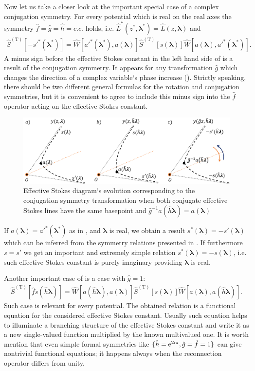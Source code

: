 \documentclass[12pt]{iopart}
\def\S{\widehat{S}}
\def\W{\widehat{W}}
\def\f{\hat{f}}
\def\g{\hat{g}}
\def\h{\hat{h}}
\def\L{\widehat{L}}
\def\lmbd{\bm{\lambda}}
\def\Tp{\mathrm{T}}
\def\unity{1}
\begin{document}
Now let us take a closer look at the important special case of a complex conjugation symmetry. 
For every potential which is real on the real axes the symmetry $\f=\g=\h=c.c.$ holds, 
i.e. $\L^*(z^*,\lmbd^*)=\L(z,\lmbd)$ and
\begin{eqnarray}
\S^{(\Tp)} \left[ -s'^*(\lmbd^*) \right] = 
\W \left[ a'^*(\lmbd^*),a(\lmbd) \right]
\S^{(\Tp)} \left[ s(\lmbd) \right]
\W \left[ a(\lmbd),a'^*(\lmbd^*) \right].
\label{eq:cnjgtn}
\end{eqnarray}
A minus sign before the effective Stokes constant in the left hand side of  is a result 
of the conjugation symmetry. It appears for any transformation $\g$ which changes the direction 
of a complex variable`s phase increase (). Strictly speaking, there should be two 
different general formulas for the rotation and conjugation symmetries, but it is convenient 
to agree to include this minus sign into the $\f$ operator acting on the effective Stokes constant.

\begin{figure}
\centering
\noindent
\includegraphics[width=\textwidth]{stuff/cs.png}
\caption{Effective Stokes diagram`s evolution corresponding to the conjugation 
symmetry transformation when both conjugate effective Stokes lines have the same 
basepoint and $\g^{-1}a(\h\lmbd)=a(\lmbd)$}
\label{fig:cst}
\end{figure} 

If $a(\lmbd)=a'^*(\lmbd^*)$ as in , and $\lmbd$ is real, we obtain a result 
$s^*(\lmbd)=-s'(\lmbd)$ which can be inferred from the symmetry relations presented in \cite{symm}. 
If furthermore $s=s'$ we get an important and extremely simple relation $s^*(\lmbd)=-s(\lmbd)$, 
i.e. such effective Stokes constant is purely imaginary providing $\lmbd$ is real.

Another important case of  is a case with $\g=\unity$:
\begin{eqnarray}
\S^{(\Tp)} \left[ \f s(\h\lmbd) \right] = 
\W \left[ a(\h\lmbd),a(\lmbd) \right]
\S^{(\Tp)} \left[ s(\lmbd) \right]
\W \left[ a(\lmbd),a(\h\lmbd) \right].
\label{eq:func}
\end{eqnarray}
Such case is relevant for every potential. The obtained relation is a functional 
equation for the considered effective Stokes constant. Usually such equation helps to illuminate 
a branching structure of the effective Stokes constant and write it as a new single-valued function 
multiplied by the known multivalued one. 
It is worth mention that even simple formal 
symmetries like $\{\h=\rme^{2\rmi\pi},\g=\f=\unity\}$
can give nontrivial functional equations; it happens always when the reconnection operator
differs from unity.
\end{document}
